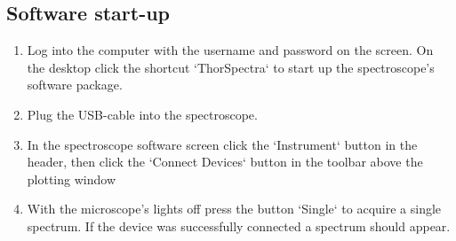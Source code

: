 \documentclass[a4paper]{scrartcl}
\begin{document}
\subsection*{Software start-up}
\begin{enumerate}
	\item Log into the computer with the username and password on the screen. On the desktop click the shortcut `ThorSpectra` to start up the spectroscope's software package.
	\item Plug the USB-cable into the spectroscope.
	\item In the spectroscope software screen click the `Instrument` button in the header, then click the `Connect Devices` button in the toolbar above the plotting window
	\item With the microscope's lights off press the button `Single` to acquire a single spectrum. If the device was successfully connected a spectrum should appear.
\end{enumerate}
\end{document}
